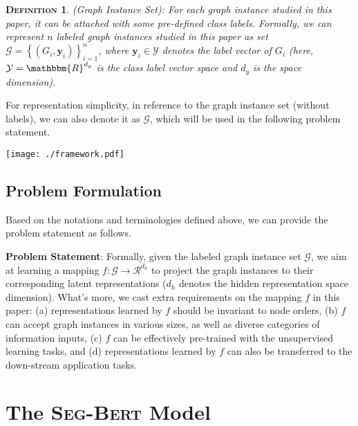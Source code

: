 \documentclass{article}
\newcommand{\mb}{\mathbf}
\newcommand{\mc}{\mathcal}
\newtheorem{definition}{\textsc{Definition}}
\newcommand{\our}{\textsc{Seg-Bert}}
\begin{document}
\begin{definition}
(Graph Instance Set): For each graph instance studied in this paper, it can be attached with some pre-defined class labels. Formally, we can represent $n$ labeled graph instances studied in this paper as set $\mc{G} = \left\{(G_i, \mb{y}_i) \right\}_{i = 1}^n$, where $\mb{y}_i \in \mc{Y}$ denotes the label vector of $G_i$ (here, $\mc{Y} = \mathbbm{R}^{d_y}$ is the class label vector space and $d_y$ is the space dimension).
\end{definition}

For representation simplicity, in reference to the graph instance set (without labels), we can also denote it as $\mc{G}$, which will be used in the following problem statement.

\begin{figure*}[t]
    \begin{minipage}{\textwidth}
    \centering
    	\texttt{[image: ./framework.pdf]}
    	\caption{An Illustration of the {\our} Model for Graph Instance Representation Learning.}
    	\label{fig:architecture}
    \end{minipage}\vspace{-5pt}
\end{figure*}


\subsection{Problem Formulation}

Based on the notations and terminologies defined above, we can provide the problem statement as follows.

\noindent \textbf{Problem Statement}: Formally, given the labeled graph instance set $\mc{G}$, we aim at learning a mapping $f: \mc{G} \to \mc{R}^{d_h}$ to project the graph instances to their corresponding latent representations ($d_h$ denotes the hidden representation space dimension). What's more, we cast extra requirements on the mapping $f$ in this paper: (a) representations learned by $f$ should be invariant to node orders, (b) $f$ can accept graph instances in various sizes, as well as diverse categories of information inputs, (c) $f$ can be effectively pre-trained with the unsupervised learning tasks, and (d) representations learned by $f$ can also be transferred to the down-stream application tasks.


\section{The {\our} Model}\label{sec:method}
\end{document}
